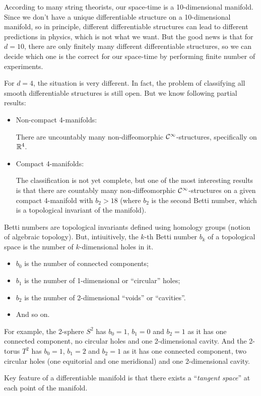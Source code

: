 \begin{remark}
	According to many string theorists, our space-time is a 10-dimensional manifold. Since we don't have a unique differentiable structure on a 10-dimensional manifold, so in principle, different differentiable structures can lead to different predictions in physics, which is not what we want. But the good news is that for \(d = 10\), there are only finitely many different differentiable structures, so we can decide which one is the correct for our space-time by performing finite number of experiments.
\end{remark}

For \(d = 4\), the situation is very different. In fact, the problem of classifying all smooth differentiable structures is still open. But we know following partial results:
\begin{itemize}
	\item Non-compact 4-manifolds:

	      There are uncountably many non-diffeomorphic \(\mathcal C^{\infty}\)-structures, specifically on \(\mathbb R^4\).

	\item Compact 4-manifolds:

	      The classification is not yet complete, but one of the most interesting results is that there are countably many non-diffeomorphic \(\mathcal C^{\infty}\)-structures on a given compact 4-manifold with \(b_2 > 18\) (where \(b_2\) is the second Betti number, which is a topological invariant of the manifold).
\end{itemize}
\begin{remark}
	Betti numbers are topological invariants defined using homology groups (notion of algebraic topology). But, intiuitively, the \(k\)-th Betti number \(b_k\) of a topological space is the number of \(k\)-dimensional holes in it.
	\begin{itemize}
		\item \(b_0\) is the number of connected components;
		\item \(b_1\) is the number of 1-dimensional or ``circular'' holes;
		\item \(b_2\) is the number of 2-dimensional ``voids'' or ``cavities''.
		\item And so on.
	\end{itemize}
	For example, the 2-sphere \(S^2\) has \(b_0 = 1\), \(b_1 = 0\) and \(b_2 = 1\) as it has one connected component, no circular holes and one 2-dimensional cavity. And the 2-torus \(T^2\) has \(b_0 = 1\), \(b_1 = 2\) and \(b_2 = 1\) as it has one connected component, two circular holes (one equitorial and one meridional) and one 2-dimensional cavity.
\end{remark}

Key feature of a differentiable manifold is that there exists a ``\emph{tangent space}'' at each point of the manifold.
